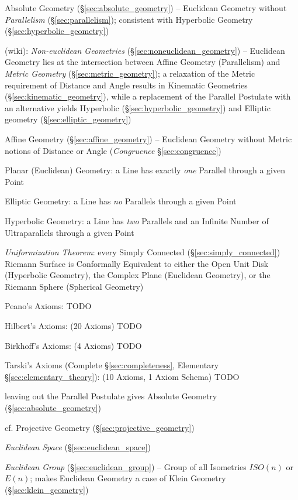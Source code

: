 Absolute Geometry (\S\ref{sec:absolute_geometry}) -- Euclidean Geometry
without \emph{Parallelism} (\S\ref{sec:parallelism}); consistent with Hyperbolic
Geometry (\S\ref{sec:hyperbolic_geometry})

(wiki): \emph{Non-euclidean Geometries} (\S\ref{sec:noneuclidean_geometry}) --
Euclidean Geometry lies at the intersection between Affine Geometry
(Parallelism) and \emph{Metric Geometry} (\S\ref{sec:metric_geometry}); a
relaxation of the Metric requirement of Distance and Angle results in Kinematic
Geometries (\S\ref{sec:kinematic_geometry}), while a replacement of the Parallel
Postulate with an alternative yields Hyperbolic
(\S\ref{sec:hyperbolic_geometry}) and Elliptic geometry
(\S\ref{sec:elliptic_geometry})

Affine Geometry (\S\ref{sec:affine_geometry}) -- Euclidean Geometry without
Metric notions of Distance or Angle (\emph{Congruence} \S\ref{sec:congruence})

Planar (Euclidean) Geometry: a Line has exactly \emph{one} Parallel through a
given Point

\fist Elliptic Geometry: a Line has \emph{no} Parallels through a given Point

\fist Hyperbolic Geometry: a Line has \emph{two} Parallels and an Infinite
Number of Ultraparallels through a given Point

\emph{Uniformization Theorem}: every Simply Connected
(\S\ref{sec:simply_connected}) Riemann Surface is Conformally Equivalent to
either the Open Unit Disk (Hyperbolic Geometry), the Complex Plane (Euclidean
Geometry), or the Riemann Sphere (Spherical Geometry)

Peano's Axioms: TODO

Hilbert's Axioms: (20 Axioms) TODO

Birkhoff's Axioms: (4 Axioms) TODO

Tarski's Axioms (Complete \S\ref{sec:completeness}, Elementary
\S\ref{sec:elementary_theory}): (10 Axioms, 1 Axiom Schema) TODO

\fist leaving out the Parallel Postulate gives Absolute Geometry
(\S\ref{sec:absolute_geometry})

cf. Projective Geometry (\S\ref{sec:projective_geometry})

\emph{Euclidean Space} (\S\ref{sec:euclidean_space})

\emph{Euclidean Group} (\S\ref{sec:euclidean_group}) -- Group of all
Isometries $ISO(n)$ or $E(n)$; makes Euclidean Geometry a case of
Klein Geometry (\S\ref{sec:klein_geometry})

